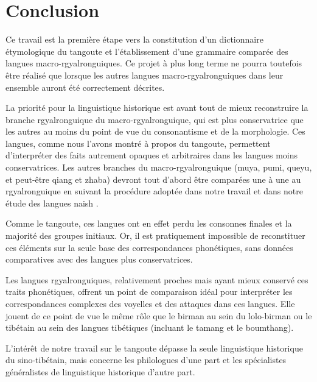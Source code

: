\documentclass[oldfontcommands,twoside,a4paper,11pt,draft]{memoir}
\begin{document}
\chapter{Conclusion}



Ce travail est la première étape vers la constitution d'un dictionnaire étymologique du tangoute et  l'établissement d'une grammaire comparée des langues macro-rgyalronguiques. Ce projet à plus long terme ne pourra toutefois être réalisé que lorsque les autres langues macro-rgyalronguiques dans leur ensemble auront été correctement décrites.

La priorité pour la linguistique historique est avant tout de mieux reconstruire la branche rgyalronguique du macro-rgyalronguique, qui est plus conservatrice que les autres au moins du point de vue du consonantisme et de la morphologie. Ces langues, comme nous l'avons montré à propos du tangoute, permettent d'interpréter des faits autrement opaques et arbitraires dans les langues moins conservatrices. Les autres branches du macro-rgyalronguique (muya, pumi, queyu, et peut-être qiang et zhaba) devront tout d'abord être comparées une à une au rgyalronguique en suivant la procédure adoptée dans notre travail et dans notre étude des langues naish \citet{jacques.michaud11naish}.

Comme le tangoute, ces langues ont en effet perdu les consonnes finales et la majorité des groupes initiaux. Or, il est pratiquement impossible de reconstituer ces éléments sur la seule base des correspondances phonétiques, sans données comparatives avec des langues plus conservatrices.

Les langues rgyalronguiques, relativement proches mais ayant mieux conservé ces traits phonétiques, offrent un point de comparaison idéal pour interpréter les correspondances complexes des voyelles et des attaques dans ces langues. Elle jouent de ce point de vue le même rôle que le birman au sein du lolo-birman ou le tibétain au sein des langues tibétiques (incluant le tamang  et le boumthang).

L'intérêt de notre travail sur le tangoute dépasse   la seule linguistique historique du sino-tibétain, mais concerne les philologues d'une part et les spécialistes généralistes de linguistique historique d'autre part.
\end{document}
